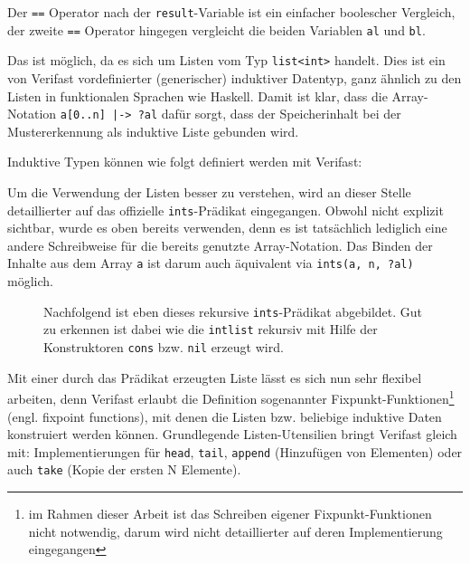 

Der \lstinline{==} Operator nach der \lstinline{result}-Variable ist ein einfacher boolescher Vergleich,
der zweite \lstinline{==} Operator hingegen vergleicht die beiden Variablen \lstinline{al} und \lstinline{bl}.

Das ist möglich, da es sich um Listen vom Typ \lstinline{list<int>} handelt. Dies ist ein
von Verifast vordefinierter (generischer) induktiver Datentyp, ganz ähnlich zu den Listen in funktionalen 
Sprachen wie Haskell. Damit ist klar, dass die Array-Notation \lstinline{a[0..n] |-> ?al} dafür sorgt, 
dass der Speicherinhalt bei der Mustererkennung als induktive Liste gebunden wird.

Induktive Typen können wie folgt definiert werden mit Verifast:



Um die Verwendung der Listen besser zu verstehen, wird an dieser Stelle detaillierter auf das offizielle 
\lstinline{ints}-Prädikat eingegangen. Obwohl nicht explizit sichtbar, wurde es oben bereits verwenden, 
denn es ist tatsächlich lediglich eine andere Schreibweise für die bereits genutzte Array-Notation. 
Das Binden der Inhalte aus dem Array \lstinline{a} ist darum auch äquivalent via 
\lstinline{ints(a, n, ?al)} möglich.

\begin{figure}[H]
Nachfolgend ist eben dieses rekursive \lstinline{ints}-Prädikat abgebildet. Gut zu erkennen ist dabei
wie die \lstinline{intlist} rekursiv mit Hilfe der Konstruktoren \lstinline{cons} bzw. \lstinline{nil} 
erzeugt wird.

\end{figure}

Mit einer durch das Prädikat erzeugten Liste lässt es sich nun sehr flexibel arbeiten, denn Verifast erlaubt 
die Definition sogenannter Fixpunkt-Funktionen\footnote{im Rahmen dieser Arbeit ist das Schreiben eigener
Fixpunkt-Funktionen nicht notwendig, darum wird nicht detaillierter auf deren Implementierung eingegangen} (engl. fixpoint functions), 
mit denen die Listen bzw. beliebige induktive Daten konstruiert werden können. Grundlegende
Listen-Utensilien bringt Verifast gleich mit: Implementierungen für \lstinline{head}, 
\lstinline{tail}, \lstinline{append} (Hinzufügen von Elementen) oder auch \lstinline{take} 
(Kopie der ersten N Elemente).



